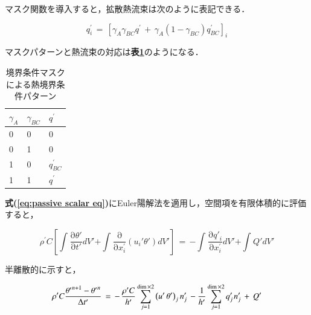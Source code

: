 \noindent マスク関数を導入すると，拡散熱流束は次のように表記できる．

\begin{equation}
{q}_{i}^{\prime}\,=\,{\left[ \gamma_{A}\gamma_{BC} q^{\prime} \,+\, \gamma_{A}(1-\gamma_{BC}) q_{BC}^{\prime} \right]}_{i}
\label{eq:flux with gamma}
\end{equation}

\noindent マスクパターンと熱流束の対応は\textbf{表\ref{tbl:gamma table}}のようになる．

\begin{table}[htdp]
\caption{境界条件マスクによる熱境界条件パターン}
\begin{center}
\small
\begin{tabular}{lll}\toprule
$\gamma_{A}$ & $\gamma_{BC}$ & $q^{\prime}$\\ \midrule
0 & 0 & 0\\
0 & 1 & 0\\
1 & 0 & $q_{BC}^{\prime}$\\
1 & 1 & $q^{\prime}$\\ \bottomrule
\end{tabular}
\end{center}
\label{tbl:gamma table}
\end{table}%

\textbf{式(\ref{eq:passive scalar eq})}にEuler陽解法を適用し，空間項を有限体積的に評価すると，

\begin{equation}
\rho^{\prime}C \left[{\mathop{\int}\nolimits_{}{\frac{\mathrm{\partial}{\mathit{\theta}}'}{\mathrm{\partial}{t}'}}{d}{V}'\mathrm{{+}}\mathop{\int}\nolimits_{}{\frac{\mathrm{\partial}}{\mathrm{\partial} x_{i}^{\prime}}\left({{{u}_{i}}'{\mathit{\theta}}'}\right)}{d}{V}'}\right]
\,=\,
\mathrm{{-}}\mathop{\int}\nolimits_{}{\frac{\mathrm{\partial}{{q}'}_{i}}{\mathrm{\partial} x_{i}^{\prime}}}{d}{V}'\mathrm{{+}}\mathop{\int}\nolimits_{}{{Q}'}{d}{V}'
\label{eq:pscalar semi-discrete}
\end{equation}

\noindent 半離散的に示すと，

\begin{equation}
\rho^{\prime}C \frac{{\theta^{\prime}}^{n+1} - {\theta^{\prime}}^{n}} {\Delta t^{\prime}}
\,=\, -\, \frac{\rho^{\prime}C}{h^{\prime}} \sum\limits_{j=1}^{\dim\times2} {\left( u^{\prime}\,\theta^{\prime} \right)}_j \,n_j^{\prime}
\,- \frac{1}{h^{\prime}} \sum\limits_{j=1}^{\dim\times2} q_{j}^{\prime} \hspace{0.1em} n_{j}^{\prime} \,+\, Q^{\prime}
\label{eq:pscalar semi-discrete2}
\end{equation}

